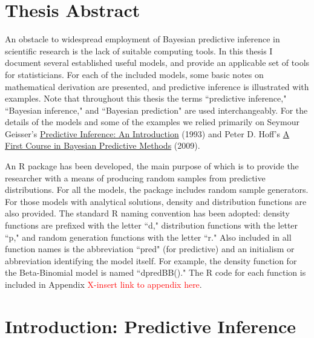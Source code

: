 \documentclass[12pt, a4paper]{article}
\begin{document}




\tableofcontents
\newpage


\section{Thesis Abstract}

An obstacle to widespread employment of Bayesian predictive inference in scientific research is the lack of suitable computing tools.  In this thesis I document several established useful models, and provide an applicable set of tools for statisticians.  For each of the included models, some basic notes on mathematical derivation are presented, and predictive inference is illustrated with examples.  Note that throughout this thesis the terms ``predictive inference," ``Bayesian inference," and ``Bayesian prediction" are used interchangeably.  For the details of the models and some of the examples we relied primarily on Seymour Geisser's \underline{Predictive Inference:  An Introduction} (1993) and Peter D. Hoff's \underline{A First Course in Bayesian Predictive Methods} (2009).

    An R package has been developed, the main purpose of which is to provide the researcher with a means of producing random samples from predictive distributions.  For all the models, the package includes random sample generators.  For those models with analytical solutions, density and distribution functions are also provided.  The standard R naming convention has been adopted:  density functions are prefixed with the letter ``d," distribution functions with the letter ``p," and random generation functions with the letter ``r."  Also included in all function names is the abbreviation ``pred" (for predictive) and an initialism or abbreviation identifying the model itself.  For example, the density function for the Beta-Binomial model is named ``dpredBB()."  The R code for each function is included in Appendix \textcolor{red}{X-insert link to appendix here}.




\section{Introduction:  Predictive Inference}
\end{document}

